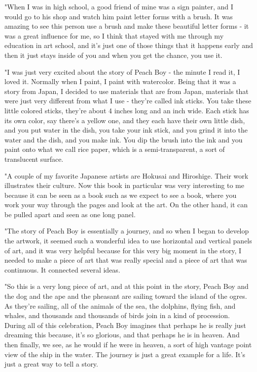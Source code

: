 "When I was in high school, a good friend of mine was a sign painter, and I would go to his shop and watch him paint letter forms with a brush. It was amazing to see this person use a brush and make these beautiful letter forms - it was a great influence for me, so I think that stayed with me through my education in art school, and it's just one of those things that it happens early and then it just stays inside of you and when you get the chance, you use it.

"I was just very excited about the story of Peach Boy - the minute I read it, I loved it. Normally when I paint, I paint with watercolor. Being that it was a story from Japan, I decided to use materials that are from Japan, materials that were just very different from what I use - they're called ink sticks. You take these little colored sticks, they're about 4 inches long and an inch wide. Each stick has its own color, say there's a yellow one, and they each have their own little dish, and you put water in the dish, you take your ink stick, and you grind it into the water and the dish, and you make ink. You dip the brush into the ink and you paint onto what we call rice paper, which is a semi-transparent, a sort of translucent surface.

"A couple of my favorite Japanese artists are Hokusai and Hiroshige. Their work illustrates their culture. Now this book in particular was very interesting to me because it can be seen as a book such as we expect to see a book, where you work your way through the pages and look at the art. On the other hand, it can be pulled apart and seen as one long panel.

"The story of Peach Boy is essentially a journey, and so when I began to develop the artwork, it seemed such a wonderful idea to use horizontal and vertical panels of art, and it was very helpful because for this very big moment in the story, I needed to make a piece of art that was really special and a piece of art that was continuous. It connected several ideas.

"So this is a very long piece of art, and at this point in the story, Peach Boy and the dog and the ape and the pheasant are sailing toward the island of the ogres. As they're sailing, all of the animals of the sea, the dolphins, flying fish, and whales, and thousands and thousands of birds join in a kind of procession. During all of this celebration, Peach Boy imagines that perhaps he is really just dreaming this because, it's so glorious, and that perhaps he is in heaven. And then finally, we see, as he would if he were in heaven, a sort of high vantage point view of the ship in the water. The journey is just a great example for a life. It's just a great way to tell a story.

